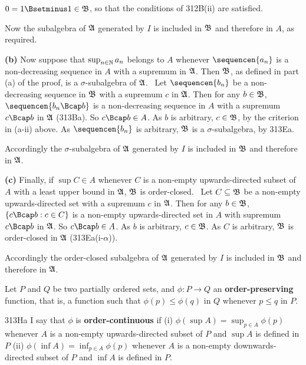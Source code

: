{\noindent $0=1\Bsetminus 1\in\frak B$, so that the conditions of
312B(ii) are satisfied.\ \Qed

Now the subalgebra of $\frak A$ generated by $I$ is included in
$\frak B$ and therefore in $A$, as required.

\medskip

{\bf (b)} Now suppose that $\sup_{n\in\Bbb N}a_n$ belongs to $A$
whenever $\sequencen{a_n}$ is a non-decreasing sequence in $A$ with a
supremum in $\frak A$.   Then $\frak B$, as defined in part (a) of the
proof, is a $\sigma$-subalgebra of $\frak A$.   \Prf\ Let
$\sequencen{b_n}$ be a non-decreasing sequence in $\frak B$ with a
supremum $c$ in $\frak A$.   Then for any $b\in\frak B$,
$\sequencen{b_n\Bcap b}$ is a non-decreasing sequence in $A$ with a
supremum $c\Bcap b$ in $\frak A$ (313Ba).   So $c\Bcap b\in A$.   As $b$
is arbitrary, $c\in\frak B$, by the criterion in (a-ii) above.   As
$\sequencen{b_n}$ is arbitrary, $\frak B$ is a $\sigma$-subalgebra, by
313Ea.\ \Qed

Accordingly the $\sigma$-subalgebra of $\frak A$ generated by $I$ is
included in $\frak B$ and therefore in $\frak A$.

\medskip

{\bf (c)} Finally, if $\sup C\in A$ whenever $C$ is a non-empty
upwards-directed subset of $A$ with a least upper bound in $\frak A$,
$\frak B$ is order-closed.
\Prf\ Let $C\subseteq\frak B$ be a non-empty upwards-directed set with a
supremum $c$ in $\frak A$.   Then for any $b\in\frak B$,
$\{c\Bcap b:c\in C\}$ is a non-empty upwards-directed set in $A$ with
supremum
$c\Bcap b$ in $\frak A$.   So $c\Bcap b\in A$.   As $b$ is arbitrary,
$c\in\frak B$.   As $C$ is arbitrary, $\frak B$ is order-closed in
$\frak A$ (313Ea(i-$\alpha$)).\ \Qed

Accordingly the order-closed subalgebra of $\frak A$ generated by $I$ is
included in $\frak B$ and therefore in $\frak A$.

}%


   Let $P$ and $Q$ be two
partially ordered sets, and $\phi:P\to Q$ an {\bf order-preserving}
function,
that is, a function such that $\phi(p)\le\phi(q)$ in $Q$ whenever
$p\le q$ in $P$.

\spheader 313Ha I say that $\phi$ is {\bf order-continuous} if (i)
$\phi(\sup A)=\sup_{p\in A}\phi(p)$ whenever $A$ is a
non-empty upwards-directed subset of $P$ and $\sup A$ is defined in $P$
(ii) $\phi(\inf A)=\inf_{p\in A}\phi(p)$ whenever $A$ is a
non-empty downwards-directed subset of $P$ and $\inf A$ is defined in
$P$.

